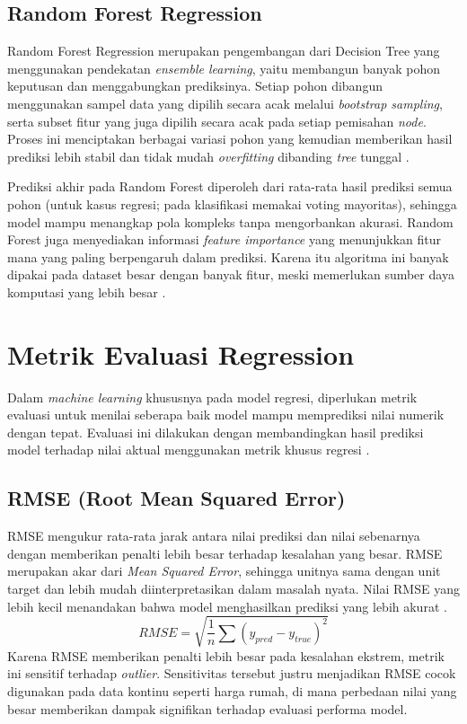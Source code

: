 \documentclass[a4paper,oneside,12pt]{report}
\begin{document}
\subsection{Random Forest Regression}
Random Forest Regression merupakan pengembangan dari Decision Tree yang menggunakan pendekatan \textit{ensemble learning}, yaitu membangun banyak pohon keputusan dan menggabungkan prediksinya. Setiap pohon dibangun menggunakan sampel data yang dipilih secara acak melalui \textit{bootstrap sampling}, serta subset fitur yang juga dipilih secara acak pada setiap pemisahan \textit{node}. Proses ini menciptakan berbagai variasi pohon yang kemudian memberikan hasil prediksi lebih stabil dan tidak mudah \textit{overfitting} dibanding \textit{tree} tunggal \cite{sklearn-ensemble,itbox-algoritma}.

Prediksi akhir pada Random Forest diperoleh dari rata-rata hasil prediksi semua pohon (untuk kasus regresi; pada klasifikasi memakai voting mayoritas), sehingga model mampu menangkap pola kompleks tanpa mengorbankan akurasi. Random Forest juga menyediakan informasi \textit{feature importance} yang menunjukkan fitur mana yang paling berpengaruh dalam prediksi. Karena itu algoritma ini banyak dipakai pada dataset besar dengan banyak fitur, meski memerlukan sumber daya komputasi yang lebih besar \cite{sklearn-ensemble}.

\section{Metrik Evaluasi Regression}
Dalam \textit{machine learning} khususnya pada model regresi, diperlukan metrik evaluasi untuk menilai seberapa baik model mampu memprediksi nilai numerik dengan tepat. Evaluasi ini dilakukan dengan membandingkan hasil prediksi model terhadap nilai aktual menggunakan metrik khusus regresi \cite{sklearn-metrics}.

\subsection{RMSE (Root Mean Squared Error)}
RMSE mengukur rata-rata jarak antara nilai prediksi dan nilai sebenarnya dengan memberikan penalti lebih besar terhadap kesalahan yang besar. RMSE merupakan akar dari \textit{Mean Squared Error}, sehingga unitnya sama dengan unit target dan lebih mudah diinterpretasikan dalam masalah nyata. Nilai RMSE yang lebih kecil menandakan bahwa model menghasilkan prediksi yang lebih akurat \cite{sklearn-metrics}.
\begin{equation}
RMSE = \sqrt{\frac{1}{n}\sum(y_{pred} - y_{true})^2}
\end{equation}
Karena RMSE memberikan penalti lebih besar pada kesalahan ekstrem, metrik ini sensitif terhadap \textit{outlier}. Sensitivitas tersebut justru menjadikan RMSE cocok digunakan pada data kontinu seperti harga rumah, di mana perbedaan nilai yang besar memberikan dampak signifikan terhadap evaluasi performa model.
\end{document}

